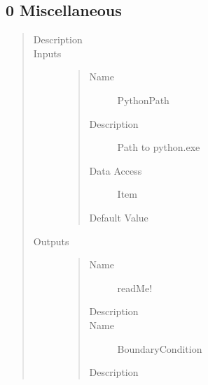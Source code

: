\documentclass[letterpaper,10pt,english]{sphinxmanual}
\begin{document}
\subsection{0 \textbar{} Miscellaneous}
\label{\detokenize{components:miscellaneous}}
\begin{quote}\begin{description}
\item[{Description}] \leavevmode
{}

\item[{Inputs}] \leavevmode\begin{quote}\begin{description}
\item[{Name}] \leavevmode
PythonPath

\item[{Description}] \leavevmode
Path to python.exe

\item[{Data Access}] \leavevmode
Item

\item[{Default Value}] \leavevmode
{}

\end{description}\end{quote}

\item[{Outputs}] \leavevmode\begin{quote}\begin{description}
\item[{Name}] \leavevmode
readMe!

\item[{Description}] \leavevmode
{}

\item[{Name}] \leavevmode
BoundaryCondition

\item[{Description}] \leavevmode
{}

\end{description}\end{quote}

\end{description}\end{quote}
\end{document}
